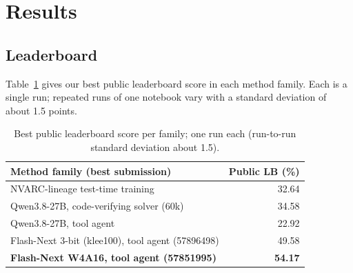 \documentclass[11pt]{article}
\begin{document}
\section{Results}
\subsection{Leaderboard}
Table~\ref{tab:lb} gives our best public leaderboard score in each method family. Each is a single run; repeated runs of one notebook vary with a standard deviation of about 1.5 points.

\begin{table}[htbp]
\centering\small
\begin{tabular}{@{}lr@{}}
\toprule
Method family (best submission) & Public LB (\%) \\
\midrule
NVARC-lineage test-time training & 32.64 \\
Qwen3.8-27B, code-verifying solver (60k) & 34.58 \\
Qwen3.8-27B, tool agent & 22.92 \\
Flash-Next 3-bit (klee100), tool agent (57896498) & 49.58 \\
\textbf{Flash-Next W4A16, tool agent (57851995)} & \textbf{54.17} \\
\bottomrule
\end{tabular}
\caption{Best public leaderboard score per family; one run each (run-to-run standard deviation about 1.5).}
\label{tab:lb}
\end{table}
\end{document}
